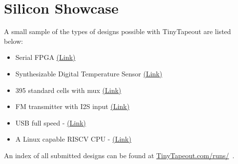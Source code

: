 \section{Silicon Showcase}
\label{sec:silicon_showcase}

A small sample of the types of designs possible with TinyTapeout are listed below:

\begin{itemize}
    \item Serial FPGA \href{https://tinytapeout.com/runs/tt02/006/}{(Link)}
    \item Synthesizable Digital Temperature Sensor \href{https://tinytapeout.com/runs/tt03/047/}{(Link)}
    \item 395 standard cells with mux \href{https://tinytapeout.com/runs/tt03/045/}{(Link)}
    \item FM transmitter with I2S input \href{https://tinytapeout.com/runs/tt04/195/}{(Link)}
    \item USB full speed - \href{https://tinytapeout.com/runs/tt04/054/}{(Link)}
    \item A Linux capable RISCV CPU - \href{https://tinytapeout.com/runs/tt05/654/}{(Link)}
\end{itemize}

An index of all submitted designs can be found at \url{TinyTapeout.com/runs/}~\cite{tinytapeoutruns}.
